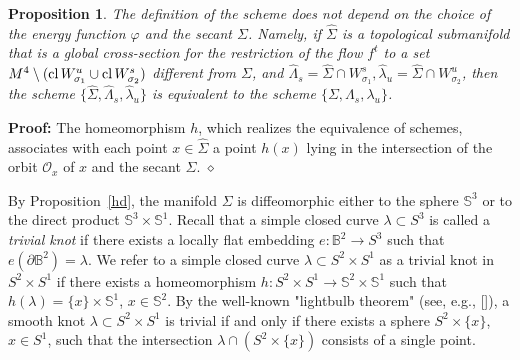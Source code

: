 \documentclass[%
 aip,
 amsmath,amssymb,
preprint,%
]{revtex4-1}
\newtheorem{propos}{Proposition}
\newenvironment{proof}{{\bf Proof:}}
{\hfill $\diamond$\medskip}
\begin{document}
\begin{propos}\label{indep} The definition of the scheme does not depend on the choice of the energy function $\varphi$ and the secant $\Sigma$. Namely, if $\widehat \Sigma$ is a topological submanifold that is a global cross-section for the restriction of the flow $f^t$ to a set $M^4\setminus ({\rm cl}\, W^u_{\sigma_1}\cup {\rm cl}\, W^s_{\sigma_2})$ different from $\Sigma$, and $\widehat \Lambda_s=\widehat \Sigma\cap W^s_{\sigma_1}, \widehat \lambda_u=\widehat \Sigma\cap W^u_{\sigma_2}$, then the scheme $\{\widehat{\Sigma}, \widehat \Lambda_s, \widehat \lambda_u\}$ is equivalent to the scheme $\{\Sigma, \Lambda_s, \lambda_u\}$.
\end{propos}
\begin{proof} The homeomorphism $h$, which realizes the equivalence of schemes, associates with each point $x\in \widehat \Sigma$ a point $h(x)$ lying in the intersection of the orbit $\mathcal O_x$ of $x$ and the secant $\Sigma$.
\end{proof}

By Proposition~\ref{hd}, the manifold $\Sigma$ is diffeomorphic either to the sphere $\mathbb S^3$ or to the direct product $\mathbb S^3\times \mathbb S^1$.
Recall that a simple closed curve $\lambda\subset S^3$ is called a \textit{trivial knot} if there exists a locally flat embedding $e: \mathbb B^2\to S^3$ such that $e(\partial \mathbb B^2)=\lambda$. We refer to  a simple closed curve $\lambda \subset S^2\times S^1$ as a trivial knot in $S^2\times S^1$ if there  exists a homeomorphism $h: S^2\times S^1\to \mathbb S^2\times \mathbb S^1$ such that $h(\lambda)=\{x\}\times \mathbb S^1$, $x\in \mathbb S^2$. By the well-known "lightbulb theorem" (see, e.g., []), a smooth knot $\lambda\subset S^2\times S^1$ is trivial if and only if there exists a sphere $S^2\times \{x\}$, $x\in S^1$, such that the intersection $\lambda\cap (S^2\times \{x\})$ consists of a single point. 
\end{document}

